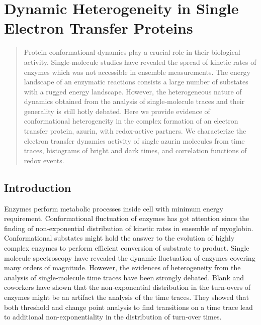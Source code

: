 \chapter{Dynamic Heterogeneity in Single Electron Transfer Proteins}
\label{chapter:azurin}
\graphicspath{{./chapters/c4_azurin_sm/main/}}
\begin{abstract}
	Protein conformational dynamics play a crucial role in their biological activity. Single-molecule studies have revealed the spread of kinetic rates of enzymes which was not accessible in ensemble measurements.
	The energy landscape of an enzymatic reactions consists a large number of substates with a rugged energy landscape.
	However, the heterogeneous nature of dynamics obtained from the analysis of single-molecule traces and their generality is still hotly debated. Here we provide evidence of conformational heterogeneity in the complex formation of an electron transfer protein, azurin, with redox-active partners. We characterize the electron transfer dynamics activity of single azurin molecules from time traces, histograms of bright and dark times, and correlation functions of redox events. 
\end{abstract}
\section{Introduction}
Enzymes perform metabolic processes inside cell with minimum energy requirement. Conformational fluctuation of enzymes has got attention since the finding of non-exponential distribution of kinetic rates in ensemble of myoglobin. \cite{frauenfelder1991the,ansari1985protein,stein1985a,henzler-wildman2007dynamic} Conformational substates might hold the answer to the evolution of highly complex enzymes to perform efficient conversion of substrate to product. Single molecule spectroscopy have revealed the dynamic fluctuation of enzymes covering many orders of magnitude.\cite{lu1998single-molecule,yang2003protein,english2006ever-fluctuating}
However, the evidences of heterogeneity from the analysis of single-molecule time traces have been strongly debated. Blank and coworkers have shown that the non-exponential distribution in the turn-overs of enzymes might be an artifact the analysis of the time traces.\cite{terentyeva2012dynamic} They showed that both threshold and change point analysis to find transitions on a time trace lead to additional non-exponentiality in the distribution of turn-over times.

